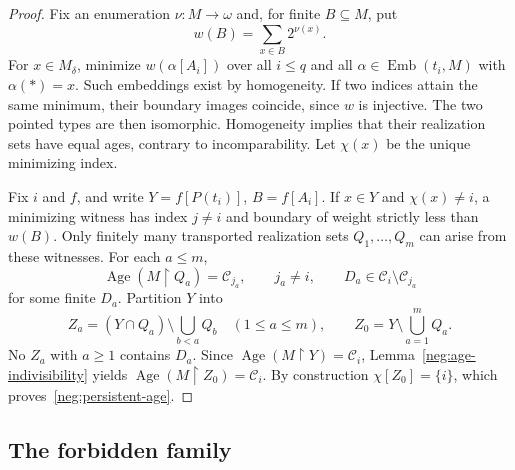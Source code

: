 \documentclass{article}
\numberwithin{equation}{section}
\theoremstyle{definition}
\DeclareMathOperator{\Emb}{Emb}
\DeclareMathOperator{\Age}{Age}
\newcommand{\res}{\mathbin{\upharpoonright}}
\begin{document}
\begin{proof}
Fix an enumeration $\nu:M\to\omega$ and, for finite $B\subseteq M$, put
\[
 w(B)=\sum_{x\in B}2^{\nu(x)}.
\]
For $x\in M_\delta$, minimize $w(\alpha[A_i])$ over all
$i\le q$ and all $\alpha\in\Emb(t_i,M)$ with $\alpha(*)=x$.
Such embeddings exist by homogeneity. If two indices attain the same
minimum, their boundary images coincide, since $w$ is injective. The two
pointed types are then isomorphic. Homogeneity implies that their
realization sets have equal ages, contrary to incomparability. Let
$\chi(x)$ be the unique minimizing index.

Fix $i$ and $f$, and write
$Y=f[P(t_i)]$, $B=f[A_i]$. If $x\in Y$ and $\chi(x)\ne i$, a minimizing
witness has index $j\ne i$ and boundary of weight strictly less than
$w(B)$. Only finitely many transported realization sets
$Q_1,\ldots,Q_m$ can arise from these witnesses. For each $a\le m$,
\[
 \Age(M\res Q_a)=\mathcal C_{j_a},\qquad j_a\ne i,
 \qquad D_a\in\mathcal C_i\setminus\mathcal C_{j_a}
\]
for some finite $D_a$. Partition $Y$ into
\[
 Z_a=(Y\cap Q_a)\setminus\bigcup_{b<a}Q_b\quad(1\le a\le m),
 \qquad Z_0=Y\setminus\bigcup_{a=1}^{m}Q_a.
\]
No $Z_a$ with $a\ge1$ contains $D_a$. Since $\Age(M\res Y)=\mathcal C_i$,
Lemma~\ref{neg:age-indivisibility} yields
$\Age(M\res Z_0)=\mathcal C_i$. By construction $\chi[Z_0]=\{i\}$,
which proves~\eqref{neg:persistent-age}.
\end{proof}

\subsection{The forbidden family}
\label{neg:family}
\end{document}
